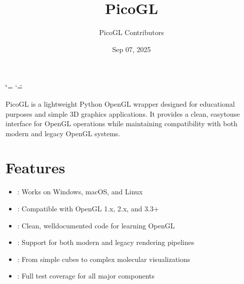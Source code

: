 \documentclass[a4paper,10pt,english,openany,oneside]{sphinxmanual}
\title{PicoGL}
\date{Sep 07, 2025}
\author{PicoGL Contributors}
\begin{document}
\ifdefined\shorthandoff
  \ifnum\catcode`\=\string=\active\shorthandoff{=}\fi
  \ifnum\catcode`\"=\active{}\fi
\fi

\pagestyle{empty}
\sphinxmaketitle
\pagestyle{plain}
\sphinxtableofcontents
\pagestyle{normal}
\label{\detokenize{index::doc}}


\sphinxAtStartPar
PicoGL is a lightweight Python OpenGL wrapper designed for educational purposes and simple 3D graphics applications. It provides a clean, easy\sphinxhyphen{}to\sphinxhyphen{}use interface for OpenGL operations while maintaining compatibility with both modern and legacy OpenGL systems.





\chapter{Features}
\label{\detokenize{index:features}}\begin{itemize}
\item {} 
\sphinxAtStartPar
{}: Works on Windows, macOS, and Linux

\item {} 
\sphinxAtStartPar
{}: Compatible with OpenGL 1.x, 2.x, and 3.3+

\item {} 
\sphinxAtStartPar
{}: Clean, well\sphinxhyphen{}documented code for learning OpenGL

\item {} 
\sphinxAtStartPar
{}: Support for both modern and legacy rendering pipelines

\item {} 
\sphinxAtStartPar
{}: From simple cubes to complex molecular visualizations

\item {} 
\sphinxAtStartPar
{}: Full test coverage for all major components

\end{itemize}
\end{document}
